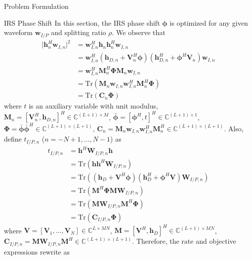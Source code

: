 \documentclass[journal]{IEEEtran}
\begin{document}
\begin{section}{Problem Formulation}
		\begin{subsection}{IRS Phase Shift}
			In this section, the IRS phase shift $\boldsymbol{\phi}$ is optimized for any given waveform $\boldsymbol{w}_{I/P}$ and splitting ratio $\rho$. We observe that
			\begin{align}
				\lvert \boldsymbol{h}_{n}^H\boldsymbol{w}_{I,n} \rvert^2
				& = \boldsymbol{w}_{I,n}^H\boldsymbol{h}_n\boldsymbol{h}_n^H\boldsymbol{w}_{I,n}\nonumber\\
				& = \boldsymbol{w}_{I,n}^H(\boldsymbol{h}_{D,n}+\boldsymbol{V}_n^H\boldsymbol{\phi})(\boldsymbol{h}_{D,n}^H+\boldsymbol{\phi}^H\boldsymbol{V}_n)\boldsymbol{w}_{I,n}\nonumber\\
				& = \boldsymbol{w}_{I,n}^H\boldsymbol{M}_n^H\boldsymbol{\Phi}\boldsymbol{M}_n\boldsymbol{w}_{I,n}\nonumber\\
				& = \mathrm{Tr}(\boldsymbol{M}_n\boldsymbol{w}_{I,n}\boldsymbol{w}_{I,n}^H\boldsymbol{M}_n^H\boldsymbol{\Phi})\nonumber\\
				& = \mathrm{Tr}(\boldsymbol{C}_n\boldsymbol{\Phi})
			\end{align}
			where $t$ is an auxiliary variable with unit modulus, $\boldsymbol{M}_n=[\boldsymbol{V}_n^H, \boldsymbol{h}_{D,n}]^H \in \mathbb{C}^{(L+1) \times M}$, $\bar{\boldsymbol{\phi}}=[\boldsymbol{\phi}^H, t]^H \in \mathbb{C}^{(L+1) \times 1}$, $\boldsymbol{\Phi}=\bar{\boldsymbol{\phi}}\bar{\boldsymbol{\phi}}^H \in \mathbb{C}^{(L+1) \times (L+1)}$, $\boldsymbol{C}_n = \boldsymbol{M}_n\boldsymbol{w}_{I,n}\boldsymbol{w}_{I,n}^H\boldsymbol{M}_n^H \in \mathbb{C}^{(L+1)\times(L+1)}$. Also, define $t_{I/P,n}$ ($n=-N+1,\dots,N-1$) as
			\begin{align}
				t_{I/P,n}
				& = \boldsymbol{h}^H\boldsymbol{W}_{I/P,n}\boldsymbol{h}\nonumber\\
				& = \mathrm{Tr}(\boldsymbol{h}\boldsymbol{h}^H\boldsymbol{W}_{I/P,n})\nonumber\\
				& = \mathrm{Tr}\left((\boldsymbol{h}_{D}+\boldsymbol{V}^H\boldsymbol{\phi})(\boldsymbol{h}_{D}^H+\boldsymbol{\phi}^H\boldsymbol{V})\boldsymbol{W}_{I/P,n}\right)\nonumber\\
				& = \mathrm{Tr}(\boldsymbol{M}^H\boldsymbol{\Phi}\boldsymbol{M}\boldsymbol{W}_{I/P,n})\nonumber\\
				& = \mathrm{Tr}(\boldsymbol{M}\boldsymbol{W}_{I/P,n}\boldsymbol{M}^H\boldsymbol{\Phi})\nonumber\\
				& = \mathrm{Tr}(\boldsymbol{C}_{I/P,n}\boldsymbol{\Phi})
			\end{align}
			where $\boldsymbol{V}=[\boldsymbol{V}_1,\dots,\boldsymbol{V}_N] \in \mathbb{C}^{L \times MN}$, $\boldsymbol{M}=[\boldsymbol{V}^H, \boldsymbol{h}_{D}]^H \in \mathbb{C}^{(L+1) \times MN}$, $\boldsymbol{C}_{I/P,n}=\boldsymbol{M}\boldsymbol{W}_{I/P,n}\boldsymbol{M}^H \in \mathbb{C}^{(L+1)\times(L+1)}$. Therefore, the rate and objective expressions rewrite as

\end{subsection}
\end{section}
\end{document}
